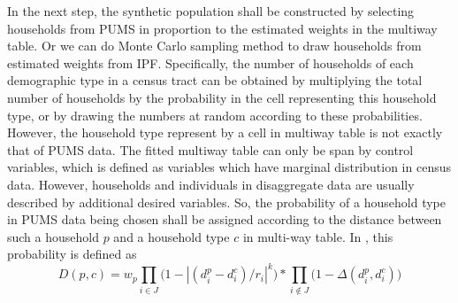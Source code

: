 \documentclass[11pt,twoside]{article}
\numberwithin{equation}{section}
\newcommand{\?}{\stackrel{?}{=}}
\begin{document}
In the next step, the synthetic population shall be constructed by selecting households from PUMS in proportion to the estimated weights in the multiway table. Or we can do Monte Carlo sampling method to draw households from estimated weights from IPF.
Specifically, the number of households of each demographic type in a census tract can be obtained by multiplying the total number of households by the probability in the cell representing this household type, or by drawing the numbers at random according to these probabilities.
However, the household type represent by a cell in multiway table is not exactly that of PUMS data.
The fitted multiway table can only be span by control variables, which is defined as variables which have marginal distribution in census data.
However, households and individuals in disaggregate data are usually described by additional desired variables.
So, the probability of a household type in PUMS data being chosen shall be assigned according to the distance between such a household $p$ and a household type $c$ in multi-way table.
In \cite{beckman1996creating}, this probability is defined as 
\begin{equation}
  D(p,c) = w_p \prod_{i \in J}\Big(1-|(d_i^p-d_i^c)/r_i|^k\Big)*\prod_{i \notin J}\Big(1-\Delta(d_i^p, d_i^c)\Big)
\end{equation}
      
\end{document}

